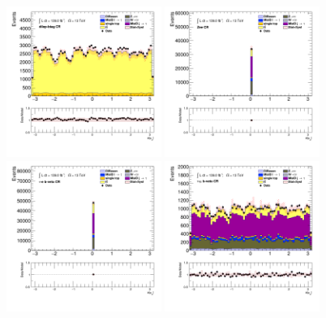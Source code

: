 		\begin{figure}[!htp]
			\begin{center}    
			\includegraphics[width=0.45\textwidth]{chapters/chapter6_HPlus/images/taulep/mu_0_phi_DILEP_BTAG.png}
			\includegraphics[width=0.45\textwidth]{chapters/chapter6_HPlus/images/taulep/mu_0_phi_ZEE.png} \\
			\includegraphics[width=0.45\textwidth]{chapters/chapter6_HPlus/images/taulep/mu_0_phi_TAUEL_BVETO.png} 
			\includegraphics[width=0.45\textwidth]{chapters/chapter6_HPlus/images/taulep/mu_0_phi_TAUMU_BVETO.png} \\

\end{center}
\end{figure}

